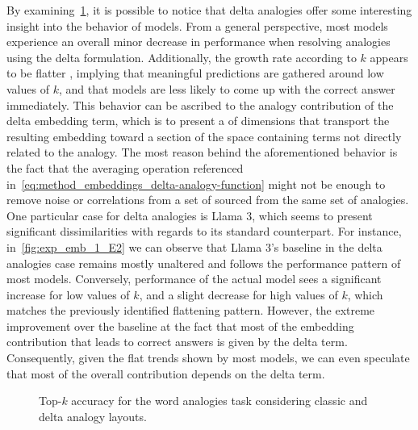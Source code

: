 By examining~\cref{fig:exp_emb_1_E}, it is possible to notice that delta analogies offer some interesting insight into the behavior of models.
From a general perspective, most models experience an overall minor decrease in performance when resolving analogies using the delta formulation.
Additionally, the growth rate according to $k$ appears to be flatter , implying that meaningful predictions are gathered around low values of $k$, and that models are less likely to come up with the correct answer  immediately.
This behavior can be ascribed to the analogy contribution of the delta embedding term, which is  to present a  of dimensions that transport the resulting embedding toward a section of the space containing terms not directly related to the analogy.
The most  reason behind the aforementioned behavior is the fact that the averaging operation referenced in~\cref{eq:method_embeddings_delta-analogy-function} might not be enough to remove noise or  correlations from a set of  sourced from the same set of analogies.
One particular case for delta analogies is Llama 3, which seems to present significant dissimilarities with regards to its standard counterpart.
For instance, in~\cref{fig:exp_emb_1_E2} we can observe that Llama 3's baseline in the delta analogies case remains mostly unaltered and follows the performance pattern of most models.
Conversely,  performance of the actual model sees a significant increase for low values of $k$, and a slight decrease for high values of $k$, which matches the previously identified flattening pattern.
However, the extreme improvement over the baseline  at the fact that most of the embedding contribution that leads to correct answers is given by the delta term.
Consequently, given the flat trends shown by most models, we can even speculate that most of the overall contribution depends on the delta term.

\begin{figure}[t!]
    \centering
    \caption{Top-$k$ accuracy for the word analogies task considering classic and delta analogy layouts.}
    \label{fig:exp_emb_1_E}
\end{figure}

